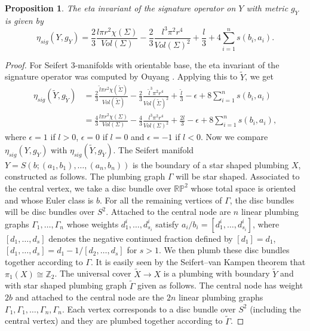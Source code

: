 \documentclass{amsart}
\newtheorem{proposition}[theorem]{Proposition}
\theoremstyle{definition}
\theoremstyle{remark}
\numberwithin{equation}{section}
\begin{document}
\begin{proposition}\label{prop:etasig}
The eta invariant of the signature operator on $Y$ with metric $g_Y$ is given by
\[
\eta_{sig}(Y , g_Y ) = \frac{2}{3} \frac{ l \pi r^2 \chi(\Sigma) }{Vol(\Sigma)} - \frac{2}{3} \frac{ l^3 \pi^2 r^4}{Vol(\Sigma)^2} + \frac{l}{3} + 4 \sum_{i=1}^{n} s(b_i,a_i).
\]
\end{proposition}
\begin{proof}
For Seifert $3$-manifolds with orientable base, the eta invariant of the signature operator was computed by Ouyang \cite{ou}. Applying this to $\widetilde{Y}$, we get
\begin{align*}
\eta_{sig}( \widetilde{Y} , g_{\widetilde{Y}} ) &= \frac{2}{3} \frac{ \widetilde{l} \pi r^2 \chi(\widetilde{\Sigma}) }{Vol(\widetilde{\Sigma})} - \frac{2}{3} \frac{ \widetilde{l}^3 \pi^2 r^4}{Vol(\widetilde{\Sigma})^2} + \frac{\widetilde{l}}{3} - \epsilon + 8 \sum_{i=1}^{n} s(b_i,a_i) \\
& = \frac{4}{3} \frac{ l \pi r^2 \chi(\Sigma) }{Vol(\Sigma)} - \frac{4}{3} \frac{ l^3 \pi^2 r^4}{Vol(\Sigma)^2} + \frac{2l}{3} - \epsilon + 8 \sum_{i=1}^{n} s(b_i,a_i),
\end{align*}
where $\epsilon = 1$ if $l > 0$, $\epsilon = 0$ if $l=0$ and $\epsilon = -1$ if $l < 0$. Now we compare $\eta_{sig}(Y, g_Y)$ with $\eta_{sig}(\widetilde{Y} , g_{\widetilde{Y}})$. The Seifert manifold $Y = S(b ; (a_1,b_1) , \dots , (a_n , b_n))$ is the boundary of a star shaped plumbing $X$, constructed as follows. The plumbing graph $\Gamma$ will be star shaped. Associated to the central vertex, we take a disc bundle over $\mathbb{RP}^2$ whose total space is oriented and whose Euler class is $b$. For all the remaining vertices of $\Gamma$, the disc bundles will be disc bundles over $S^2$. Attached to the central node are $n$ linear plumbing graphs $\Gamma_1, \dots , \Gamma_n$ whose weights $d^i_1, \dots , d^i_{s_i}$ satisfy $a_i/b_i = [d^i_1 , \dots , d^i_{s_i}]$, where $[d_1 , \dots , d_s]$ denotes the negative continued fraction defined by $[d_1] = d_1$, $[d_1 , \dots , d_s] = d_1 - 1/[d_2 , \dots , d_s]$ for $s > 1$. We then plumb these disc bundles together according to $\Gamma$. It is easily seen by the Seifert--van Kampen theorem that $\pi_1(X) \cong \mathbb{Z}_2$. The universal cover $\widetilde{X} \to X$ is a plumbing with boundary $\widetilde{Y}$ and with star shaped plumbing graph $\widetilde{\Gamma}$ given as follows. The central node has weight $2b$ and attached to the central node are the $2n$ linear plumbing graphs $\Gamma_1, \Gamma_1 , \dots , \Gamma_n , \Gamma_n$. Each vertex corresponds to a disc bundle over $S^2$ (including the central vertex) and they are plumbed together according to $\widetilde{\Gamma}$.


\end{proof}
\end{document}
